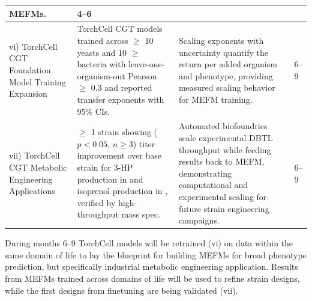 \begin{table}[H]
\begin{tabular}{L{30mm}L{62mm}L{62mm}L{12mm}}
    MEFMs. &
    4--6 \\
    \midrule
    vi) TorchCell CGT Foundation Model Training Expansion &
    TorchCell CGT models trained across $\geq$ 10 yeasts and 10 $\geq$ bacteria
    with leave-one-organism-out Pearson $\geq$ 0.3 and reported transfer exponents
    with 95\% CIs. &
    Scaling exponents with uncertainty quantify the return per added organism and
    phenotype, providing measured scaling behavior for MEFM training. &
    6--9 \\
    \midrule
    vii) TorchCell CGT Metabolic Engineering Applications &
    $\geq$ 1 strain showing ($p < 0.05$, $n \geq 3$) titer improvement over base
    strain for 3-HP production in  and isoprenol production in
    , verified by high-throughput mass spec. &
    Automated biofoundries scale experimental DBTL throughput while feeding results
    back to MEFM, demonstrating computational and experimental scaling for future
    strain engineering campaigns. &
    6--9 \\
    \bottomrule
  \end{tabular}
\end{table}

During months 6--9 TorchCell models will be retrained (vi) on data within the same
domain of life to lay the blueprint for building MEFMs for broad phenotype
prediction, but specifically industrial metabolic engineering application. Results
from MEFMs trained across domains of life will be used to refine strain designs,
while the first designs from finetuning are being validated (vii).
